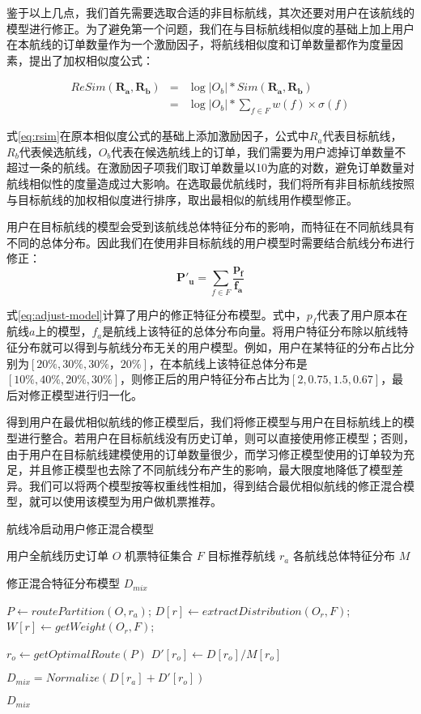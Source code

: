 鉴于以上几点，我们首先需要选取合适的非目标航线，其次还要对用户在该航线的模型进行修正。为了避免第一个问题，我们在与目标航线相似度的基础上加上用户在本航线的订单数量作为一个激励因子，将航线相似度和订单数量都作为度量因素，提出了加权相似度公式：

\begin{eqnarray}
\label{eq:rsim}
	ReSim(\mathbf{R_a,R_b}) & = & \log{|O_b|} * Sim(\mathbf{R_a,R_b})  \nonumber \\
                        & = & \log{|O_b|} * \sum_{f \in F}w(f) \times \sigma(f)
\end{eqnarray}

式\ref{eq:rsim}在原本相似度公式的基础上添加激励因子，公式中$R_a$代表目标航线，$R_b$代表候选航线，$O_b$代表在候选航线上的订单，我们需要为用户滤掉订单数量不超过一条的航线。在激励因子项我们取订单数量以10为底的对数，避免订单数量对航线相似性的度量造成过大影响。在选取最优航线时，我们将所有非目标航线按照与目标航线的加权相似度进行排序，取出最相似的航线用作模型修正。

用户在目标航线的模型会受到该航线总体特征分布的影响，而特征在不同航线具有不同的总体分布。因此我们在使用非目标航线的用户模型时需要结合航线分布进行修正：
\begin{equation}
\label{eq:adjust-model}
	\mathbf{P'_u} = \sum_{f \in F} \frac{\mathbf{p_f}}{\mathbf{f_a}}
\end{equation}

式\ref{eq:adjust-model}计算了用户的修正特征分布模型。式中，$p_f$代表了用户原本在航线$a$上的模型，$f_a$是航线上该特征的总体分布向量。将用户特征分布除以航线特征分布就可以得到与航线分布无关的用户模型。例如，用户在某特征的分布占比分别为$[20\%,30\%,30\%，20\%]$，在本航线上该特征总体分布是$[10\%,40\%,20\%,30\%]$，则修正后的用户特征分布占比为$[2,0.75,1.5,0.67]$，最后对修正模型进行归一化。

得到用户在最优相似航线的修正模型后，我们将修正模型与用户在目标航线上的模型进行整合。若用户在目标航线没有历史订单，则可以直接使用修正模型；否则，由于用户在目标航线建模使用的订单数量很少，而学习修正模型使用的订单较为充足，并且修正模型也去除了不同航线分布产生的影响，最大限度地降低了模型差异。我们可以将两个模型按等权重线性相加，得到结合最优相似航线的修正混合模型，就可以使用该模型为用户做机票推荐。

\begin{algorithm}
\caption{航线冷启动用户修正混合模型}
\label{algo:air_cold_dis}
\begin{algorithmic}[1]
\Require
\Statex 用户全航线历史订单 $O$
\Statex 机票特征集合 $F$
\Statex 目标推荐航线 $r_a$
\Statex 各航线总体特征分布 $M$

\Ensure 
\Statex 修正混合特征分布模型 $D_{mix}$

\State $P \gets routePartition(O,r_a)$;
\State $D[r] \gets extractDistribution(O_r,F)$;
\State $W[r] \gets getWeight(O_r,F)$;
\EndFor

\State $r_o \gets getOptimalRoute(P)$
\State $D'[r_o] \gets D[r_o] / M[r_o]$

\State $D_{mix} = Normalize(D[r_a] + D'[r_o])$

\State \Return $D_{mix}$
\end{algorithmic}
\end{algorithm}


